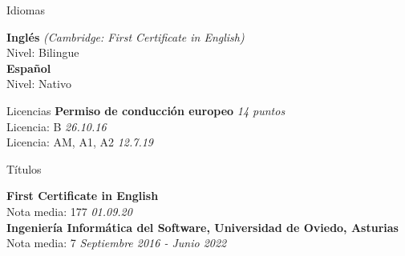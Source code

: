 \documentclass{resume} %
\begin{document}
\begin{rSection}{Idiomas}

{\bf Inglés} \hfill {\em (Cambridge: First Certificate in English)}\\
Nivel: Bilingue \\
{\bf Español} \\
Nivel: Nativo \\
\end{rSection}
\begin{rSection}{Licencias}
{\bf Permiso de conducción europeo} \hfill {\em 14 puntos}\\ 
Licencia: B \hfill {\em 26.10.16} \\
Licencia: AM, A1, A2 \hfill {\em 12.7.19} \\

\end{rSection}


\begin{rSection}{Títulos}

{\bf First Certificate in English} \\ 
Nota media: 177 \hfill {\em 01.09.20} \\

{\bf Ingeniería Informática del Software, Universidad de Oviedo, Asturias} \\
Nota media: 7 \hfill {\em Septiembre 2016 - Junio 2022} \\ 


\end{rSection}

\end{document}
